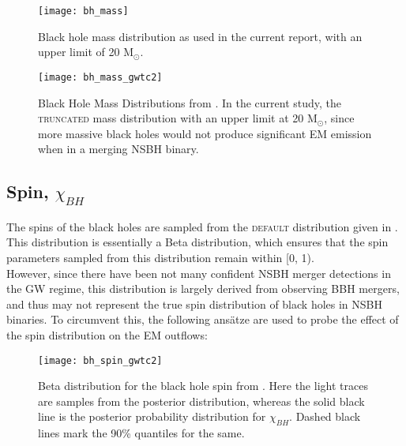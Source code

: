         \begin{figure}[H]
            \centering
            \texttt{[image: bh\_mass]}
            \caption[Black hole mass distribution with upper limit]
            {
                Black hole mass distribution as used in the current report, with an
                upper limit of 20 M$_\odot$.
            }
            \label{fig:bh_mass}
        \end{figure}

        \begin{figure}
            \centering
            \texttt{[image: bh\_mass\_gwtc2]}
            \caption[Black hole mass distributions from GWTC-2]
            {
                Black Hole Mass Distributions from \cite{abbott_2020B}. In the current
                study, the \textsc{truncated} mass distribution with an upper limit at
                20 M$_\odot$, since more massive black holes would not produce
                significant EM emission when in a merging NSBH binary.
            }
            \label{fig:bh_mass_gwtc2}
        \end{figure}

    \subsection{Spin, $\chi_{BH}$}\label{sub:spin-dists}
        The spins of the black holes are sampled from the \textsc{default} distribution
        given in \cite{abbott_2020B}. This distribution is essentially a Beta
        distribution, which ensures that the spin parameters sampled from this
        distribution remain within [0, 1).\\
        However, since there have been not many confident NSBH merger detections in the
        GW regime, this distribution is largely derived from observing BBH mergers, and
        thus may not represent the true spin distribution of black holes in NSBH
        binaries.  To circumvent this, the following ans\"{a}tze are used to probe the
        effect of the spin distribution on the EM outflows:

        \begin{figure}[H]
            \centering
            \texttt{[image: bh\_spin\_gwtc2]}
            \caption[Black hole spin distribution from GWTC-2]{
                Beta distribution for the  black hole spin from \cite{abbott_2020B}.
                Here the light traces are samples from the posterior distribution,
                whereas the solid black line is the posterior probability distribution
                for $\chi_{BH}$. Dashed black lines mark the 90\% quantiles for the
                same.
            }
            \label{fig:bh_spin_gwtc2}
        \end{figure}


